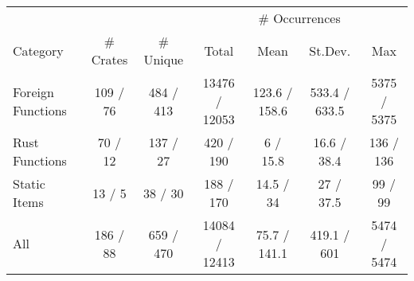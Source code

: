 \begin{tabular}{lcc|cccc}
  \hline
  & & & \multicolumn{4}{c}{\# Occurrences} \\
 Category & \# Crates & \# Unique & Total & Mean & St.Dev. & Max \\
 \hline
Foreign Functions & 109 / 76 & 484 / 413 & 13476 / 12053 & 123.6 / 158.6 & 533.4 / 633.5 & 5375 / 5375 \\ 
  Rust Functions & 70 / 12 & 137 / 27 & 420 / 190 & 6 / 15.8 & 16.6 / 38.4 & 136 / 136 \\ 
  Static Items & 13 / 5 & 38 / 30 & 188 / 170 & 14.5 / 34 & 27 / 37.5 & 99 / 99 \\ 
  All & 186 / 88 & 659 / 470 & 14084 / 12413 & 75.7 / 141.1 & 419.1 / 601 & 5474 / 5474 \\ 
   \hline
\end{tabular}
